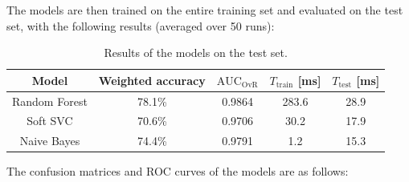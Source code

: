 \documentclass{article}
\begin{document}
The models are then trained on the entire training set and evaluated on the test set, with the following results (averaged over 50 runs):

\begin{table}[h]
    \centering
    \begin{tabular}{c|c|c|c|c}
        \toprule
        Model & Weighted accuracy & $\text{AUC}_{\text{OvR}}$ & $T_{\text{train}}$ [ms] & $T_{\text{test}}$ [ms] \\
        \midrule
        Random Forest & 78.1\% & 0.9864 & 283.6 & 28.9 \\
        Soft SVC & 70.6\% & 0.9706 & 30.2 & 17.9 \\
        Naive Bayes & 74.4\% & 0.9791 & 1.2 & 15.3 \\
        \bottomrule
    \end{tabular}
    \caption{
        Results of the models on the test set.
    }
    \label{tab:results}
\end{table}

The confusion matrices and ROC curves of the models are as follows:
\end{document}
